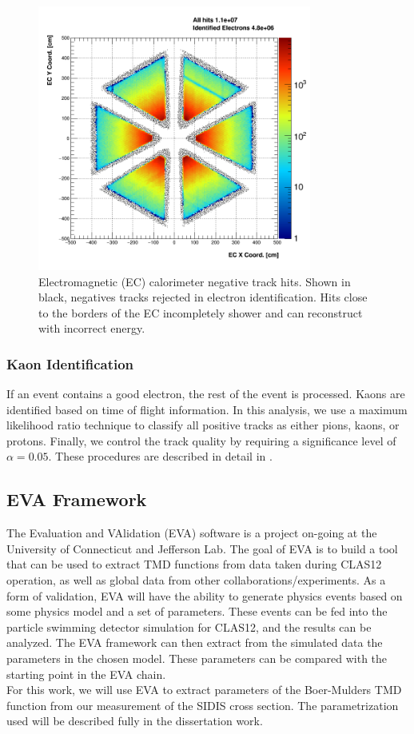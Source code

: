 \begin{figure}
  \centering
  \includegraphics[width=9cm]{image/ECFiducial.png}
  \caption{Electromagnetic (EC) calorimeter negative track hits.  Shown in black, negatives tracks rejected in electron identification.  Hits close to the borders of the EC incompletely shower and can reconstruct with incorrect energy.}
  \label{fig:ecfid}
\end{figure}

\subsubsection{Kaon Identification}
If an event contains a good electron, the rest of the event is processed.  Kaons are identified based on time of flight information.  In this analysis, we use a maximum likelihood ratio technique to classify all positive tracks as either pions, kaons, or protons.  Finally, we control the track quality by requiring a significance level of $\alpha = 0.05$.  These procedures are described in detail in \cite{kaon-note}.

\subsection{EVA Framework}
The Evaluation and VAlidation (EVA) software is a project on-going at the University of Connecticut and Jefferson Lab.  The goal of EVA is to build a tool that can be used to extract TMD functions from data taken during CLAS12 operation, as well as global data from other collaborations/experiments.  As a form of validation, EVA will have the ability to generate physics events based on some physics model and a set of parameters.  These events can be fed into the particle swimming detector simulation for CLAS12, and the results can be analyzed.  The EVA framework can then extract from the simulated data the parameters in the chosen model.  These parameters can be compared with the starting point in the EVA chain. \\

For this work, we will use EVA to extract parameters of the Boer-Mulders TMD function from our measurement of the SIDIS cross section.  The parametrization used will be described fully in the dissertation work.

